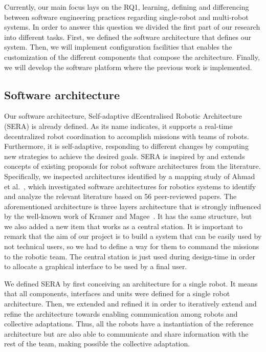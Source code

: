 Currently, our main focus lays on the RQ1, learning, defining and differencing between software engineering practices regarding single-robot and multi-robot systems.
In order to answer this question we divided the first part of our research into different tasks.
First, we defined the software architecture that defines our system.
Then, we will implement configuration facilities that enables the customization of the different components that compose the architecture.
Finally, we will develop the software platform where the previous work is implemented.

\subsection{Software architecture}

Our software architecture, Self-adaptive dEcentralised Robotic Architecture (SERA) is already defined.
As its name indicates, it supports a real-time decentralized robot coordination to accomplish missions with teams of robots. 
Furthermore, it is self-adaptive, responding to different changes by computing new strategies to achieve the desired goals.
SERA is inspired by and extends concepts of existing proposals for robot software architectures from the literature. 
Specifically, we inspected architectures identified by a mapping study of Ahmad et al.~\cite{Ahmad201616}, which investigated software architectures for robotics systems to identify and analyze the relevant literature based on 56 peer-reviewed papers.
The aforementioned architecture is three layers architecture that is strongly influenced by the well-known work of Kramer and Magee~\cite{kramer}.
It has the same structure, but we also added a new item that works as a central station.
It is important to remark that the aim of our project is to build a system that can be easily used by not technical users, so we had to define a way for them to command the missions to the robotic team.
The central station is just used during design-time in order to allocate a graphical interface to be used by a final user.

We defined SERA by first conceiving an architecture for a single robot. 
It means that all components, interfaces and units were defined for a single robot architecture. 
Then, we extended and refined it in order to iteratively extend and refine the architecture towards enabling communication among robots and collective adaptations. 
Thus, all the robots have a instantiation of the reference architecture but are also able to communicate and share information with the rest of the team, making possible the collective adaptation. 

